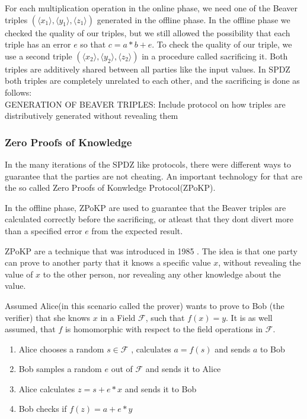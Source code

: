 \documentclass[english,runningheads,a4paper]{llncs}[2018/03/10]
\begin{document}
For each multiplication operation in the online phase, we need one of the Beaver triples \( (\langle x_1 \rangle ,\langle y_1\rangle , \langle z_1\rangle )\) generated in the offline phase. In the offline phase we checked the quality of our triples, but we still allowed the possibility that each triple has an error \(e\) so that \(c=a*b+e\). To check the quality of our triple, we use a second triple \( (\langle x_2 \rangle ,\langle y_2\rangle ,\langle z_2\rangle )\) in a procedure called sacrificing it. Both triples are additively shared between all parties like the input values. In SPDZ both triples are completely unrelated to each other, and the sacrificing is done as follows:\\


GENERATION OF BEAVER TRIPLES: Include protocol on how triples are distributively generated without revealing them



\subsubsection{Zero Proofs of Knowledge}
In the many iterations of the SPDZ like protocols, there were different ways to guarantee that the parties are not cheating. An important technology for that are the so called Zero Proofs of Konwledge Protocol(ZPoKP).

In the offline phase, ZPoKP are used to guarantee that the Beaver triples are calculated correctly before the sacrificing, or atleast that they dont divert more than a specified error \(e\) from the expected result.

ZPoKP are a technique that was introduced  in 1985 \cite{Goldwasser:1985:KCI:22145.22178}. The idea is that one party can prove to another party that it knows a specific value \(x\), without revealing the value of \(x\) to the other person, nor revealing any other knowledge about the value. 

Assumed Alice(in this scenario called the prover) wants to prove to Bob (the verifier) that she knows \( x\) in a Field \( \mathcal{F} \), such that \(f(x)=y\). It is as well assumed, that \( f \) is homomorphic with respect to the field operations in  \( \mathcal{F} \).
\begin{enumerate}
\item Alice chooses a random \( s \in \mathcal{F} \) , calculates \( a = f(s)\) and sends \( a\) to Bob
\item Bob samples a random  \( e \) out of  \( \mathcal{F} \) and sends it to Alice
\item Alice calculates \( z=s+e*x\) and sends it to Bob
\item Bob checks if \( f(z)=a+e*y\)
\end{enumerate}
\end{document}
